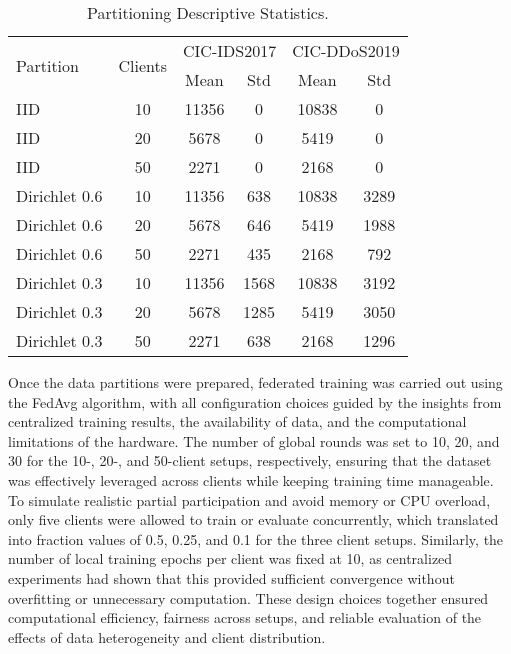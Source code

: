 \begin{table}[h]
    \caption{Partitioning Descriptive Statistics.}
    \centering
    \begin{tabular}{l|c|c|c|c|c}
        \multirow{2}{*}{Partition} & \multirow{2}{*}{Clients} & \multicolumn{2}{|c|}{CIC-IDS2017} & \multicolumn{2}{|c}{CIC-DDoS2019} \\
        \cline{3-6} & & Mean & Std & Mean & Std \\
        \hline\hline
        IID & 10 & 11356 & 0 & 10838 & 0 \\
        IID & 20 & 5678 & 0 & 5419 & 0 \\
        IID & 50 & 2271 & 0 & 2168 & 0 \\
        Dirichlet 0.6 & 10 & 11356 & 638 & 10838 & 3289 \\
        Dirichlet 0.6 & 20 & 5678 & 646 & 5419 & 1988 \\
        Dirichlet 0.6 & 50 & 2271 & 435 & 2168 & 792 \\
        Dirichlet 0.3 & 10 & 11356 & 1568 & 10838 & 3192 \\
        Dirichlet 0.3 & 20 & 5678 & 1285 & 5419 & 3050 \\
        Dirichlet 0.3 & 50 & 2271 & 638 & 2168 & 1296 \\
    \end{tabular}
    \label{tbl:partition_descriptive}
\end{table}

Once the data partitions were prepared, federated training was carried out using the FedAvg algorithm, with all configuration choices guided by the insights from centralized training results, the availability of data, and the computational limitations of the hardware. The number of global rounds was set to 10, 20, and 30 for the 10-, 20-, and 50-client setups, respectively, ensuring that the dataset was effectively leveraged across clients while keeping training time manageable. To simulate realistic partial participation and avoid memory or CPU overload, only five clients were allowed to train or evaluate concurrently, which translated into fraction values of 0.5, 0.25, and 0.1 for the three client setups. Similarly, the number of local training epochs per client was fixed at 10, as centralized experiments had shown that this provided sufficient convergence without overfitting or unnecessary computation. These design choices together ensured computational efficiency, fairness across setups, and reliable evaluation of the effects of data heterogeneity and client distribution.

